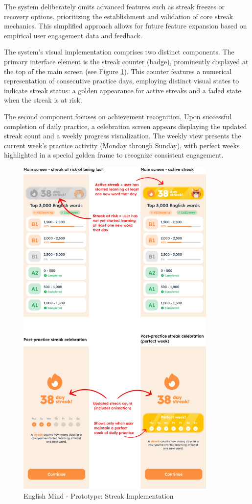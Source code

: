 The system deliberately omits advanced features such as streak freezes or recovery options, prioritizing the establishment and validation of core streak mechanics. This simplified approach allows for future feature expansion based on empirical user engagement data and feedback.

The system's visual implementation comprises two distinct components. The primary interface element is the streak counter (badge), prominently displayed at the top of the main screen (see Figure \ref{fig:em-prototype-streak}). This counter features a numerical representation of consecutive practice days, employing distinct visual states to indicate streak status: a golden appearance for active streaks and a faded state when the streak is at risk.

The second component focuses on achievement recognition. Upon successful completion of daily practice, a celebration screen appears displaying the updated streak count and a weekly progress visualization. The weekly view presents the current week's practice activity (Monday through Sunday), with perfect weeks highlighted in a special golden frame to recognize consistent engagement.

\begin{figure}[!h]
    \includegraphics[width=0.88\textwidth]{src/figures/em-prototype-streak.png}
    \caption{English Mind - Prototype: Streak Implementation}
    \label{fig:em-prototype-streak}
\end{figure}